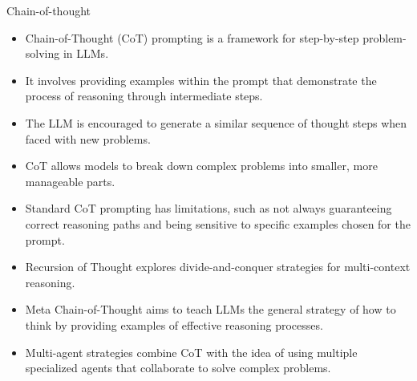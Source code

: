 \begin{frame}[allowframebreaks]{Chain-of-thought}
\begin{itemize}
	\item Chain-of-Thought (CoT) prompting is a framework for step-by-step problem-solving in LLMs.
	\item It involves providing examples within the prompt that demonstrate the process of reasoning through intermediate steps.
	\item The LLM is encouraged to generate a similar sequence of thought steps when faced with new problems.
	\item CoT allows models to break down complex problems into smaller, more manageable parts.
	\item Standard CoT prompting has limitations, such as not always guaranteeing correct reasoning paths and being sensitive to specific examples chosen for the prompt.

	\item Recursion of Thought explores divide-and-conquer strategies for multi-context reasoning.
	\item Meta Chain-of-Thought aims to teach LLMs the general strategy of how to think by providing examples of effective reasoning processes.
	\item Multi-agent strategies combine CoT with the idea of using multiple specialized agents that collaborate to solve complex problems.


\end{itemize}
\end{frame}
